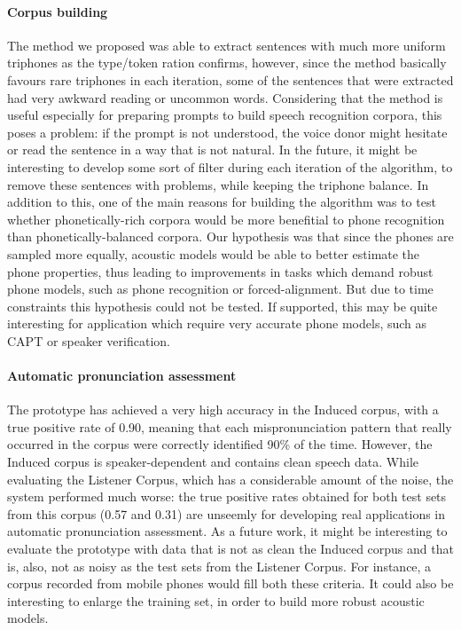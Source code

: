 \paragraph*{Corpus building}
The method we proposed was able to extract sentences with much more uniform triphones as the type/token ration confirms, however, since the method basically favours rare triphones in each iteration, some of the sentences that were extracted had very awkward reading or uncommon words. Considering that the method is useful especially for preparing prompts to build speech recognition corpora, this poses a problem: if the prompt is not understood, the voice donor might hesitate or read the sentence in a way that is not natural. In the future, it might be interesting to develop some sort of filter during each iteration of the algorithm, to remove these sentences with problems, while keeping the triphone balance. In addition to this, one of the main reasons for building the algorithm was to test whether phonetically-rich corpora would be more benefitial to phone recognition than phonetically-balanced corpora. Our hypothesis was that  since the phones are sampled more equally, acoustic models would be able to better estimate the phone properties, thus leading to improvements in tasks which demand robust phone models, such as phone recognition or forced-alignment. But due to time constraints this hypothesis could not be tested. If supported, this may be quite interesting for application which require very accurate phone models, such as \ac{CAPT} or speaker verification.

\paragraph*{Automatic pronunciation assessment}
The prototype has achieved a very high accuracy in the Induced corpus, with a true positive rate of 0.90, meaning that each mispronunciation pattern that really occurred in the corpus were correctly identified 90\% of the time. However, the Induced corpus is speaker-dependent and contains clean speech data. While evaluating the Listener Corpus, which has a considerable amount of the noise, the system performed much worse: the true positive rates obtained for both test sets from this corpus (0.57 and 0.31) are unseemly for developing real applications in automatic pronunciation assessment. As a future work, it might be interesting to evaluate the prototype with data that is not as clean the Induced corpus and that is, also, not as noisy as the test sets from the Listener Corpus. For instance, a corpus recorded from mobile phones would fill both these criteria. It could also be interesting to enlarge the training set, in order to build more robust acoustic models.

